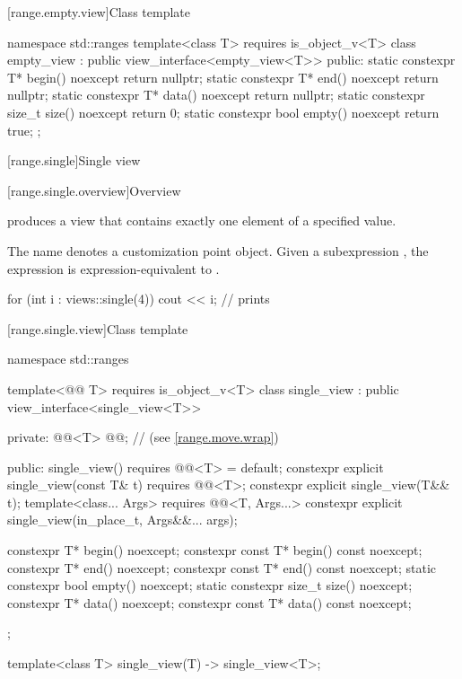 [range.empty.view]{Class template }

%
\begin{codeblock}
namespace std::ranges {
  template<class T>
    requires is_object_v<T>
  class empty_view : public view_interface<empty_view<T>> {
  public:
    static constexpr T* begin() noexcept { return nullptr; }
    static constexpr T* end() noexcept { return nullptr; }
    static constexpr T* data() noexcept { return nullptr; }
    static constexpr size_t size() noexcept { return 0; }
    static constexpr bool empty() noexcept { return true; }
  };
}
\end{codeblock}

[range.single]{Single view}

[range.single.overview]{Overview}

\pnum
{} produces a view that contains
exactly one element of a specified value.

\pnum
{}%
The name  denotes a
customization point object.
Given a subexpression , the expression
 is expression-equivalent to
.

\pnum
\begin{example}
\begin{codeblock}
for (int i : views::single(4))
  cout << i;        // prints 
\end{codeblock}
\end{example}

[range.single.view]{Class template }

%
\begin{codeblock}
namespace std::ranges {
  template<@@ T>
    requires is_object_v<T>
  class single_view : public view_interface<single_view<T>> {
  private:
    @@<T> @@;              // \expos{} (see \ref{range.move.wrap})

  public:
    single_view() requires @@<T> = default;
    constexpr explicit single_view(const T& t) requires @@<T>;
    constexpr explicit single_view(T&& t);
    template<class... Args>
      requires @@<T, Args...>
    constexpr explicit single_view(in_place_t, Args&&... args);

    constexpr T* begin() noexcept;
    constexpr const T* begin() const noexcept;
    constexpr T* end() noexcept;
    constexpr const T* end() const noexcept;
    static constexpr bool empty() noexcept;
    static constexpr size_t size() noexcept;
    constexpr T* data() noexcept;
    constexpr const T* data() const noexcept;
  };

  template<class T>
    single_view(T) -> single_view<T>;
}
\end{codeblock}

